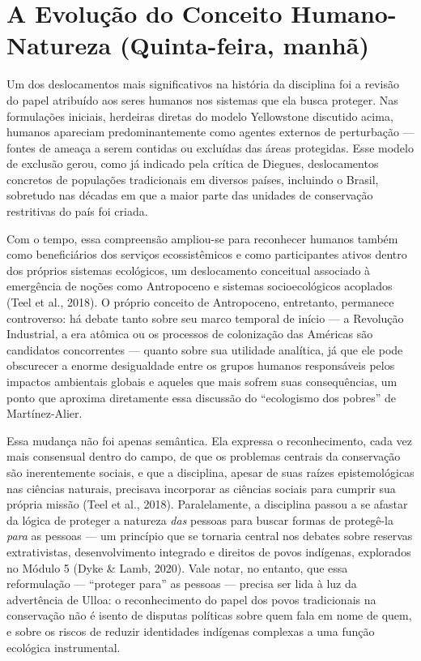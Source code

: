 \documentclass[
  portuguese,
  letterpaper,
  DIV=11,
  numbers=noendperiod]{scrartcl}
\begin{document}
\section{A Evolução do Conceito Humano-Natureza (Quinta-feira,
manhã)}\label{a-evoluuxe7uxe3o-do-conceito-humano-natureza-quinta-feira-manhuxe3}

Um dos deslocamentos mais significativos na história da disciplina foi a
revisão do papel atribuído aos seres humanos nos sistemas que ela busca
proteger. Nas formulações iniciais, herdeiras diretas do modelo
Yellowstone discutido acima, humanos apareciam predominantemente como
agentes externos de perturbação --- fontes de ameaça a serem contidas ou
excluídas das áreas protegidas. Esse modelo de exclusão gerou, como já
indicado pela crítica de Diegues, deslocamentos concretos de populações
tradicionais em diversos países, incluindo o Brasil, sobretudo nas
décadas em que a maior parte das unidades de conservação restritivas do
país foi criada.

Com o tempo, essa compreensão ampliou-se para reconhecer humanos também
como beneficiários dos serviços ecossistêmicos e como participantes
ativos dentro dos próprios sistemas ecológicos, um deslocamento
conceitual associado à emergência de noções como Antropoceno e sistemas
socioecológicos acoplados (Teel et al., 2018). O próprio conceito de
Antropoceno, entretanto, permanece controverso: há debate tanto sobre
seu marco temporal de início --- a Revolução Industrial, a era atômica
ou os processos de colonização das Américas são candidatos concorrentes
--- quanto sobre sua utilidade analítica, já que ele pode obscurecer a
enorme desigualdade entre os grupos humanos responsáveis pelos impactos
ambientais globais e aqueles que mais sofrem suas consequências, um
ponto que aproxima diretamente essa discussão do ``ecologismo dos
pobres'' de Martínez-Alier.

Essa mudança não foi apenas semântica. Ela expressa o reconhecimento,
cada vez mais consensual dentro do campo, de que os problemas centrais
da conservação são inerentemente sociais, e que a disciplina, apesar de
suas raízes epistemológicas nas ciências naturais, precisava incorporar
as ciências sociais para cumprir sua própria missão (Teel et al., 2018).
Paralelamente, a disciplina passou a se afastar da lógica de proteger a
natureza \emph{das} pessoas para buscar formas de protegê-la \emph{para}
as pessoas --- um princípio que se tornaria central nos debates sobre
reservas extrativistas, desenvolvimento integrado e direitos de povos
indígenas, explorados no Módulo 5 (Dyke \& Lamb, 2020). Vale notar, no
entanto, que essa reformulação --- ``proteger para'' as pessoas ---
precisa ser lida à luz da advertência de Ulloa: o reconhecimento do
papel dos povos tradicionais na conservação não é isento de disputas
políticas sobre quem fala em nome de quem, e sobre os riscos de reduzir
identidades indígenas complexas a uma função ecológica instrumental.
\end{document}
